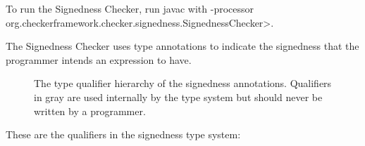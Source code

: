 To run the Signedness Checker, run javac with
\<-processor org.checkerframework.checker.signedness.SignednessChecker>.



The Signedness Checker uses type annotations to indicate the signedness that the programmer intends an expression to have.

\begin{figure}
\caption{The type qualifier hierarchy of the signedness annotations.
Qualifiers in gray are used internally by the type system but should never be written by a programmer.}
\label{fig-signedness-hierarchy}
\end{figure}

These are the qualifiers in the signedness type system:

